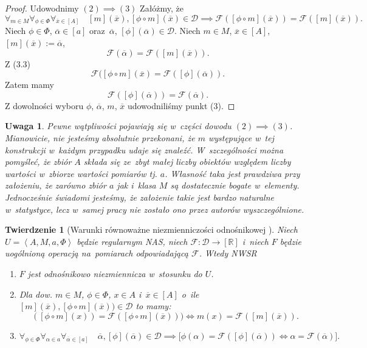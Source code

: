 \documentclass[12pt,a4paper]{report}
\newtheorem{tw}[definition]{Twierdzenie}
\newtheorem{remark}[definition]{Uwaga}
\newcommand{\domkniecie}[1]{\left[ {#1} \right] }
\newcommand{\tuple}[1]{\left\langle {#1} \right\rangle}
\begin{document}
\begin{proof}
Udowodnimy $(2) \implies (3)$
Załóżmy, że
\begin{equation}
\forall_{m \in M}\forall_{\phi \in \Phi} \forall_{\overline{x} \in \domkniecie{A}} \quad \domkniecie{m}(\overline{x}),\domkniecie{\phi\circ m}(\overline{x}) \in \mathcal{D} \implies \mathcal{F}( \domkniecie{\phi \circ m}(\overline{x}))=\mathcal{F}(\domkniecie{m}(\overline{x})).
\end{equation}
Niech $\phi \in \Phi$, $\overline{\alpha} \in \domkniecie{a}$ oraz~$\overline{\alpha}$, $\domkniecie{\phi}(\overline{\alpha})\in \mathcal{D}$. Niech $m \in M$, $\overline{x} \in \domkniecie{A}$, $\domkniecie{m}(\overline{x}):= \overline{\alpha}$, 
$$
 \mathcal{F}(\overline{\alpha})=\mathcal{F}(\domkniecie{m}(\overline{x})).
$$
Z (3.3)
$$
\mathcal{F}(\domkniecie{\phi \circ m}(\overline{x})=\mathcal{F}(\domkniecie{\phi}(\overline{\alpha})).
$$
Zatem mamy
$$
\mathcal{F}(\domkniecie{\phi}(\overline{\alpha}))=\mathcal{F}(\overline{\alpha}).
$$
Z dowolności wyboru $\phi$, $\overline{\alpha}$, $m$, $\overline{x}$ udowodniliśmy punkt (3).
\end{proof}
\begin{remark}
Pewne wątpliwości pojawiają się w~części dowodu $(2) \implies (3)$. Mianowicie, nie jesteśmy absolutnie przekonani, że $m$ występujące w~tej konstrukcji w~każdym przypadku udaje się znaleźć. W~szczególności można pomyśleć, że zbiór $A$ składa się ze~zbyt małej liczby obiektów względem liczby wartości w~zbiorze wartości pomiarów tj. $a$. Własność taka jest prawdziwa przy założeniu, że zarówno zbiór $a$ jak i~klasa $M$ są dostatecznie bogate w~elementy. Jednocześnie świadomi jesteśmy, że założenie takie jest bardzo naturalne w~statystyce, lecz w~samej pracy nie zostało ono przez autorów wyszczególnione. 
\end{remark}
\begin{tw}[Warunki równoważne niezmienniczości odnośnikowej {\citep[Tw. 1]{adams1965theory}}]
Niech $U=\tuple{A,M,a,\Phi}$ będzie regularnym NAS, niech $\mathcal{F}:\mathcal{D}\to \domkniecie{\mathbb{R}}$ i~niech $F$ będzie uogólnioną operacją na~pomiarach odpowiadającą $\mathcal{F}$. Wtedy
NWSR
\begin{enumerate}
\item
$F$ jest odnośnikowo niezmiennicza w~stosunku do $U$.
\item
Dla dow. $m \in M$, $\phi \in \Phi$, $ x \in A$ i~$\overline{x} \in \domkniecie{A}$ o~ile $\domkniecie{m}(\overline{x}), \domkniecie{\phi\circ m}(\overline{x})) \in \mathcal{D}$ to mamy:
$$
(\domkniecie{\phi\circ m}(x))=\mathcal{F}( \domkniecie{\phi \circ m}(\overline{x}))) \iff m(x)=\mathcal{F}(\domkniecie{m}(\overline{x})).
$$
\item
$$
\forall_{\phi \in \Phi}\forall_{\alpha \in a}\forall_{\overline{\alpha} \in \domkniecie{a}} \quad \overline{\alpha}, \domkniecie{\phi}(\overline{\alpha}) \in \mathcal{D} \implies \big[\phi(\alpha)=\mathcal{F}(\domkniecie{\phi}(\overline{\alpha})) \iff \alpha=\mathcal{F}(\overline{\alpha})\big].
$$
\end{enumerate}

\end{tw}
\end{document}
